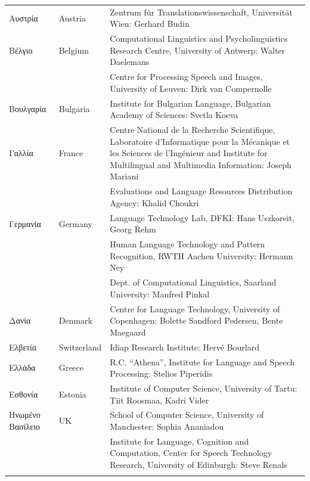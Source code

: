\small
\begin{longtable}{@{}llp{113mm}@{}}
  Αυστρία & \textcolor{grey1}{Austria} & Zentrum für Translationswissenschaft, Universität Wien: Gerhard Budin\\ \addlinespace 
  Βέλγιο & \textcolor{grey1}{Belgium} & Computational Linguistics and Psycholinguistics Research Centre, University of Antwerp: Walter Daelemans\\ \addlinespace
  & & Centre for Processing Speech and Images, University of Leuven: Dirk van Compernolle \\ \addlinespace
  Βουλγαρία & \textcolor{grey1}{Bulgaria} & Institute for Bulgarian Language, Bulgarian Academy of Sciences: Svetla Koeva \\ \addlinespace
  Γαλλία & \textcolor{grey1}{France} & Centre National de la Recherche Scientifique, Laboratoire d'Informatique pour la Mécanique et les Sciences de l'Ingénieur and Institute for Multilingual and Multimedia Information: Joseph Mariani \\ \addlinespace
  & & Evaluations and Language Resources Distribution Agency: Khalid Choukri\\ \addlinespace 
  Γερμανία & \textcolor{grey1}{Germany} & Language Technology Lab, DFKI: Hans Uszkoreit, Georg Rehm\\ \addlinespace
  & & Human Language Technology and Pattern Recognition, RWTH Aachen University: Hermann Ney \\ \addlinespace
  & & Dept. of Computational Linguistics, Saarland University: Manfred Pinkal\\ \addlinespace Δανία &  \textcolor{grey1}{Denmark} & Centre for Language Technology, University of Copenhagen: \newline Bolette Sandford Pedersen, Bente Maegaard\\ \addlinespace
  Ελβετία & \textcolor{grey1}{Switzerland} & Idiap Research Institute: Hervé Bourlard \\ \addlinespace 
  Ελλάδα & \textcolor{grey1}{Greece} & R.C. “Athena”, Institute for Language and Speech Processing: Stelios Piperidis\\ \addlinespace
  Εσθονία & \textcolor{grey1}{Estonia} & Institute of Computer Science, University of Tartu: Tiit Roosmaa, Kadri Vider\\ \addlinespace
  Ηνωμένο Βασίλειο & \textcolor{grey1}{UK} & School of Computer Science, University of Manchester: Sophia Ananiadou \\ \addlinespace 
  & & Institute for Language, Cognition and Computation, Center for Speech Technology Research, University of Edinburgh: Steve Renals \\ \addlinespace 

\end{longtable}
